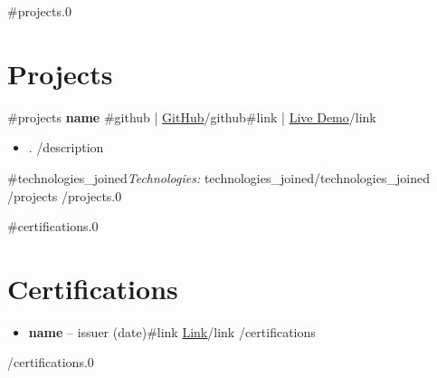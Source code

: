 \documentclass[11pt,a4paper]{article}
\begin{document}
{{#projects.0}}
\section{Projects}
 {{#projects}}
\textbf{ {{name}} }{{#github}} \quad | \quad \href{ {{github}} }{GitHub}{{/github}}{{#link}} \quad | \quad \href{ {{link}} }{Live Demo}{{/link}}\\
\begin{itemize}[leftmargin=*,nosep]
 {{#description}}
    \item {{.}}
 {{/description}}
\end{itemize}
 {{#technologies_joined}}\textit{Technologies:} {{technologies_joined}}{{/technologies_joined}}
 {{/projects}}
{{/projects.0}}

{{#certifications.0}}
\section{Certifications}
\begin{itemize}[leftmargin=*,nosep]
 {{#certifications}}
    \item \textbf{ {{name}} } -- {{issuer}} ({{date}}){{#link}} \hfill \href{ {{link}} }{Link}{{/link}}
 {{/certifications}}
\end{itemize}
{{/certifications.0}}
\end{document}
